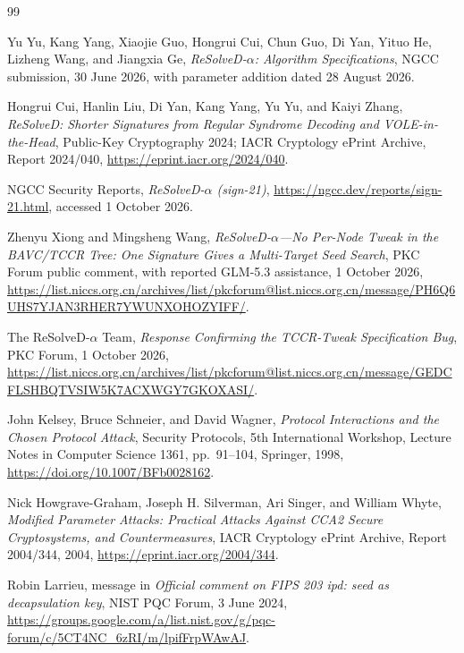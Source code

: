 \documentclass[11pt,a4paper]{article}
\begin{document}
\begin{thebibliography}{99}
\small

Yu Yu, Kang Yang, Xiaojie Guo, Hongrui Cui, Chun Guo, Di Yan, Yituo He,
Lizheng Wang, and Jiangxia Ge,
\emph{ReSolveD-$\alpha$: Algorithm Specifications}, NGCC submission,
30 June 2026, with parameter addition dated 28 August 2026.

Hongrui Cui, Hanlin Liu, Di Yan, Kang Yang, Yu Yu, and Kaiyi Zhang,
\emph{ReSolveD: Shorter Signatures from Regular Syndrome Decoding and
VOLE-in-the-Head}, Public-Key Cryptography 2024; IACR Cryptology ePrint
Archive, Report 2024/040,
\url{https://eprint.iacr.org/2024/040}.

NGCC Security Reports,
\emph{ReSolveD-$\alpha$ (sign-21)},
\url{https://ngcc.dev/reports/sign-21.html}, accessed 1 October 2026.

Zhenyu Xiong and Mingsheng Wang,
\emph{ReSolveD-$\alpha$---No Per-Node Tweak in the BAVC/TCCR Tree: One
Signature Gives a Multi-Target Seed Search},
PKC Forum public comment, with reported GLM-5.3 assistance, 1 October 2026,
\url{https://list.niccs.org.cn/archives/list/pkcforum@list.niccs.org.cn/message/PH6Q6UHS7YJAN3RHER7YWUNXOHOZYIFF/}.

The ReSolveD-$\alpha$ Team,
\emph{Response Confirming the TCCR-Tweak Specification Bug},
PKC Forum, 1 October 2026,
\url{https://list.niccs.org.cn/archives/list/pkcforum@list.niccs.org.cn/message/GEDCFLSHBQTVSIW5K7ACXWGY7GKOXASI/}.

John Kelsey, Bruce Schneier, and David Wagner,
\emph{Protocol Interactions and the Chosen Protocol Attack},
Security Protocols, 5th International Workshop, Lecture Notes in Computer
Science 1361, pp.~91--104, Springer, 1998,
\url{https://doi.org/10.1007/BFb0028162}.

Nick Howgrave-Graham, Joseph H. Silverman, Ari Singer, and William Whyte,
\emph{Modified Parameter Attacks: Practical Attacks Against CCA2 Secure
Cryptosystems, and Countermeasures},
IACR Cryptology ePrint Archive, Report 2004/344, 2004,
\url{https://eprint.iacr.org/2004/344}.

Robin Larrieu,
message in \emph{Official comment on FIPS 203 ipd: seed as decapsulation key},
NIST PQC Forum, 3 June 2024,
\url{https://groups.google.com/a/list.nist.gov/g/pqc-forum/c/5CT4NC_6zRI/m/lpifFrpWAwAJ}.


\end{thebibliography}
\end{document}
